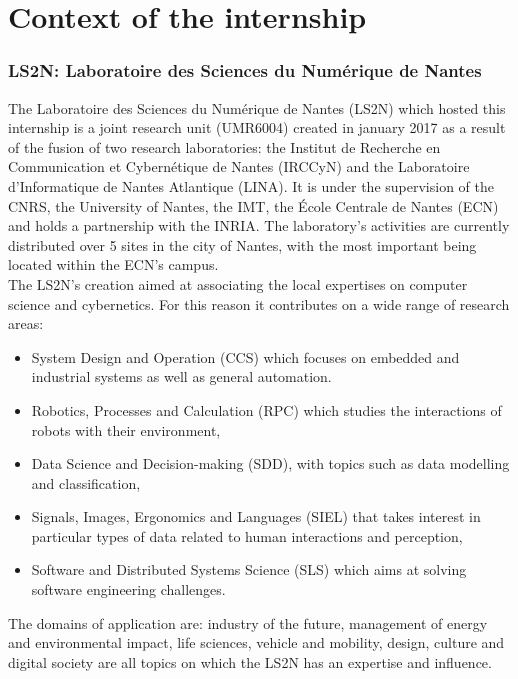 \documentclass[12pt,times,onecolumn]{article}
\begin{document}
\clearpage
\tableofcontents
\clearpage
\listoffigures
\listoftables
\clearpage



\part{Context of the internship}
\section{LS2N: Laboratoire des Sciences du Num\'erique de Nantes}
The Laboratoire des Sciences du Num\'erique de Nantes (LS2N) which hosted this internship is a joint research unit (UMR6004) created in january 2017 as a result of the fusion of two research laboratories: the Institut de Recherche en Communication et Cybern\'etique de Nantes (IRCCyN) and the Laboratoire d'Informatique de Nantes Atlantique (LINA). It is under the supervision of the CNRS, the University of Nantes, the IMT, the \'Ecole Centrale de Nantes (ECN) and holds a partnership with the INRIA. The laboratory's activities are currently distributed over 5 sites in the city of Nantes, with the most important being located within the ECN's campus.\\

The LS2N's creation aimed at associating the local expertises on computer science and cybernetics. For this reason it contributes on a wide range of research areas:
\begin{itemize}
\item System Design and Operation (CCS) which focuses on embedded and industrial systems as well as general automation.
\item Robotics, Processes and Calculation (RPC) which studies the interactions of robots with their environment,
\item Data Science and Decision-making (SDD), with topics such as data modelling and classification,
\item Signals, Images, Ergonomics and Languages (SIEL) that takes interest in particular types of data related to human interactions and perception,
\item Software and Distributed Systems Science (SLS) which aims at solving software engineering challenges.
\end{itemize}
The domains of application are: industry of the future, management of energy and environmental impact, life sciences, vehicle and mobility, design, culture and digital society are all topics on which the LS2N has an expertise and influence.\\
\end{document}
